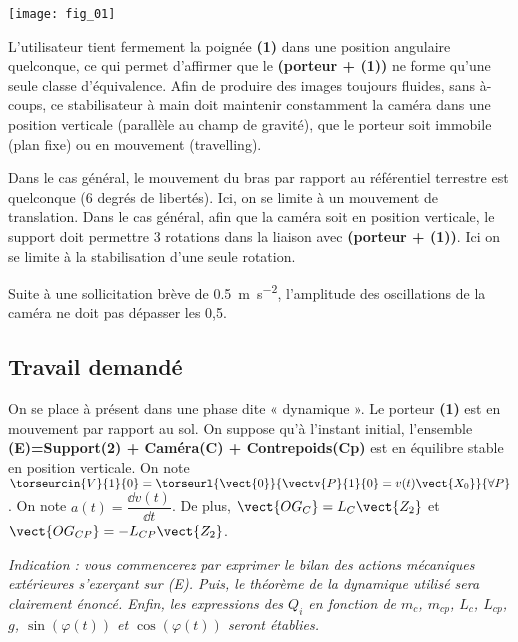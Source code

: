 \begin{center}
\texttt{[image: fig\_01]}
\end{center}

L’utilisateur tient fermement la poignée \textbf{(1)} dans une position angulaire quelconque, ce qui permet d’affirmer que le \textbf{(porteur + (1))} ne forme qu’une seule classe d’équivalence.
Afin de produire des images toujours fluides, sans à-coups, ce
stabilisateur à main doit maintenir constamment la caméra dans
une position verticale (parallèle au champ de
gravité), que le porteur soit immobile (plan fixe) ou en
mouvement (travelling).

Dans le cas général, le mouvement du bras par rapport au référentiel terrestre est quelconque (6 degrés de libertés). Ici, on se limite à un mouvement de translation. Dans le cas général, afin que la caméra soit en position verticale, le support doit permettre 3 rotations dans la liaison avec \textbf{(porteur + (1))}. Ici on se limite à la stabilisation d'une seule rotation. 
 \fi
\begin{obj}
Suite à une sollicitation brève de \SI{0,5}{m.s^{-2}}, l'amplitude des oscillations de la caméra ne doit pas dépasser les 0,5\degres.
\end{obj}

\subsection*{Travail demandé}
\ifprof
\else
On se place à présent dans une phase dite « dynamique ». Le porteur \textbf{(1)} est en mouvement par rapport au sol. On suppose qu'à l'instant initial, l'ensemble \textbf{(E)=Support(2) + Caméra(C) + Contrepoids(Cp)} est en équilibre stable en position verticale. On note $\torseurcin{V}{1}{0}=\torseurl{\vect{0}}{\vectv{P}{1}{0}=v(t)\vect{X_0}}{\forall P}$.
On note $a(t)=\dfrac{\dd v(t)}{\dd t}$. De plus, $\vect{OG_C}=L_C\vect{Z_2}$ et $\vect{OG_{CP}}=-L_{CP}\vect{Z_2}$.
\fi


\ifdifficile
\ifprof
\else
\textit{Indication : vous commencerez par exprimer le bilan des actions mécaniques extérieures s’exerçant sur (E). Puis,
le théorème de la dynamique utilisé sera clairement énoncé. Enfin, les expressions des $Q_i$ en fonction de $m_c$,
$m_{cp}$, $L_c$, $L_{cp}$, $g$, $\sin\left(\varphi(t)\right)$ et $\cos\left(\varphi(t)\right)$ seront établies.}
\fi

